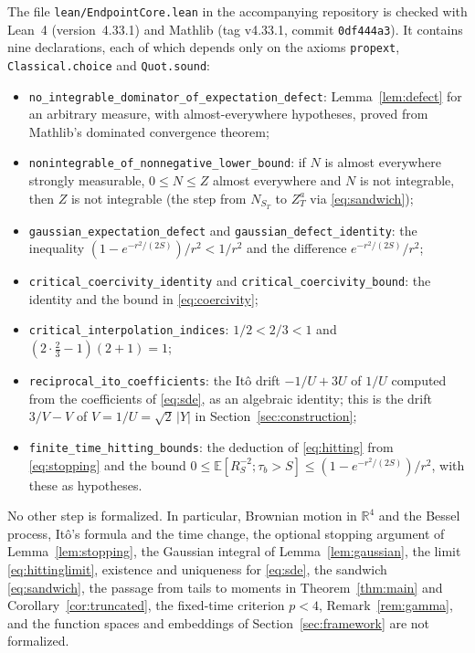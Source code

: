 \documentclass[11pt]{amsart}
\theoremstyle{remark}
\newcommand{\E}{\mathbb E}
\newcommand{\R}{\mathbb R}
\begin{document}
The file \texttt{lean/EndpointCore.lean} in the accompanying repository is checked with Lean~4 \cite{Lean} (version~4.33.1) and Mathlib \cite{Mathlib} (tag v4.33.1, commit \texttt{0df444a3}). It contains nine declarations, each of which depends only on the axioms \texttt{propext}, \texttt{Classical.choice} and \texttt{Quot.sound}:
\begin{itemize}[leftmargin=2em]\raggedright
\item \texttt{no\_integrable\_dominator\_of\_expectation\_defect}: Lemma~\ref{lem:defect} for an arbitrary measure, with almost-everywhere hypotheses, proved from Mathlib's dominated convergence theorem;
\item \texttt{nonintegrable\_of\_nonnegative\_lower\_bound}: if $N$ is almost everywhere strongly measurable, $0\le N\le Z$ almost everywhere and $N$ is not integrable, then $Z$ is not integrable (the step from $N_{S_T}$ to $Z_T^a$ via \eqref{eq:sandwich});
\item \texttt{gaussian\_expectation\_defect} and \texttt{gaussian\_defect\_identity}: the inequality $(1-e^{-r^2/(2S)})/r^2<1/r^2$ and the difference $e^{-r^2/(2S)}/r^2$;
\item \texttt{critical\_coercivity\_identity} and \texttt{critical\_coercivity\_bound}: the identity and the bound in \eqref{eq:coercivity};
\item \texttt{critical\_interpolation\_indices}: $1/2<2/3<1$ and $(2\cdot\frac23-1)(2+1)=1$;
\item \texttt{reciprocal\_ito\_coefficients}: the It\^o drift $-1/U+3U$ of $1/U$ computed from the coefficients of \eqref{eq:sde}, as an algebraic identity; this is the drift $3/V-V$ of $V=1/U=\sqrt2\,|Y|$ in Section~\ref{sec:construction};
\item \texttt{finite\_time\_hitting\_bounds}: the deduction of \eqref{eq:hitting} from \eqref{eq:stopping} and the bound $0\le\E[R_S^{-2};\tau_b>S]\le(1-e^{-r^2/(2S)})/r^2$, with these as hypotheses.
\end{itemize}
No other step is formalized. In particular, Brownian motion in $\R^4$ and the Bessel process, It\^o's formula and the time change, the optional stopping argument of Lemma~\ref{lem:stopping}, the Gaussian integral of Lemma~\ref{lem:gaussian}, the limit \eqref{eq:hittinglimit}, existence and uniqueness for \eqref{eq:sde}, the sandwich \eqref{eq:sandwich}, the passage from tails to moments in Theorem~\ref{thm:main} and Corollary~\ref{cor:truncated}, the fixed-time criterion $p<4$, Remark~\ref{rem:gamma}, and the function spaces and embeddings of Section~\ref{sec:framework} are not formalized.
\end{document}
